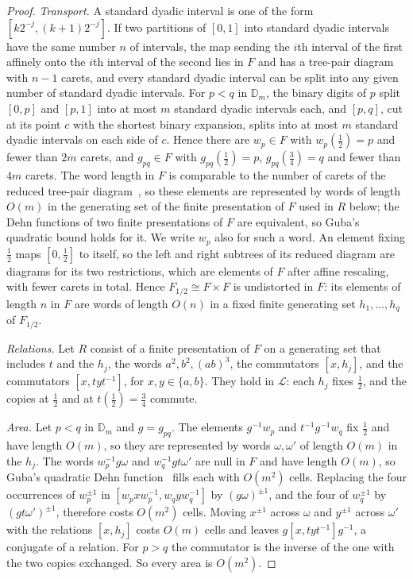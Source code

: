 \begin{proof}
\emph{Transport.} A standard dyadic interval is one of the form $[k2^{-j},(k+1)2^{-j}]$. If two partitions of $[0,1]$ into standard dyadic
intervals have the same number $n$ of intervals, the map sending the $i$th interval of the first affinely onto the $i$th interval of the second
lies in $F$ and has a tree-pair diagram with $n-1$ carets, and every standard dyadic interval can be split into any given number of standard
dyadic intervals. For $p<q$ in $\mathbb D_m$, the binary digits of $p$ split $[0,p]$ and $[p,1]$ into at most $m$ standard dyadic
intervals each, and $[p,q]$, cut at its point $c$ with the shortest binary expansion, splits into at most $m$ standard dyadic intervals
on each side of $c$. Hence there are $w_p\in F$ with $w_p(\frac12)=p$ and fewer than $2m$ carets, and $g_{pq}\in F$ with $g_{pq}(\frac12)=p$, $g_{pq}(\frac34)=q$ and fewer than $4m$
carets. The word length in $F$ is comparable to the number of carets of the reduced tree-pair diagram~\cite{BCS2001}, so these elements
are represented by words of length $O(m)$ in the generating set of the finite presentation of $F$ used in $R$ below; the Dehn functions of
two finite presentations of $F$ are equivalent, so Guba's quadratic bound holds for it. We write $w_p$ also for such a word. An element fixing
$\frac12$ maps $[0,\frac12]$ to itself, so the left and right subtrees of its reduced diagram are diagrams for its two restrictions, which are
elements of $F$ after affine rescaling, with fewer carets in total. Hence $F_{1/2}\cong F\times F$ is undistorted in $F$: its elements of
length $n$ in $F$ are words of length $O(n)$ in a fixed finite generating set $h_1,\dots,h_q$ of $F_{1/2}$.

\emph{Relations.} Let $R$ consist of a finite presentation of $F$ on a generating set that includes $t$ and the $h_j$, the words
$a^2,b^2,(ab)^3$, the commutators $[x,h_j]$, and the commutators $[x,tyt^{-1}]$, for $x,y\in\{a,b\}$. They hold in $\mathcal L$: each $h_j$
fixes $\frac12$, and the copies at $\frac12$ and at $t(\frac12)=\frac34$ commute.

\emph{Area.} Let $p<q$ in $\mathbb D_m$ and $g=g_{pq}$. The elements $g^{-1}w_p$ and $t^{-1}g^{-1}w_q$ fix $\frac12$ and have length
$O(m)$, so they are represented by words $\omega,\omega'$ of length $O(m)$ in the $h_j$. The words $w_p^{-1}g\omega$ and $w_q^{-1}gt\omega'$ are null
in $F$
and have length $O(m)$, so Guba's quadratic Dehn function~\cite{Guba2006} fills each with $O(m^2)$ cells. Replacing the four
occurrences of $w_p^{\pm1}$ in $[w_pxw_p^{-1},w_qyw_q^{-1}]$ by $(g\omega)^{\pm1}$, and the four of $w_q^{\pm1}$ by $(gt\omega')^{\pm1}$, therefore
costs
$O(m^2)$ cells. Moving $x^{\pm1}$ across $\omega$ and $y^{\pm1}$ across $\omega'$ with the relations $[x,h_j]$ costs $O(m)$ cells and leaves
$g[x,tyt^{-1}]g^{-1}$, a conjugate of a relation. For $p>q$ the commutator is the inverse of the one with the two copies exchanged. So every
area is $O(m^2)$.


\end{proof}
